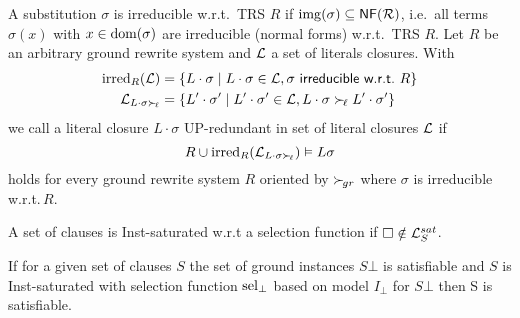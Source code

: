 \begin{definition}
    A substitution \( \sigma \) is irreducible w.r.t.~TRS \( R \)
    if
    \( \operatorname{img}(\sigma)\subseteq\mathsf{NF}(\mathcal{R}) \),
    i.e.~all terms \(\sigma(x)\) with
    \( x\in\operatorname{dom}(\sigma) \) are irreducible (normal forms) w.r.t.~TRS \(R\).
    Let $R$ be an arbitrary ground rewrite system
    and $\mathcal{L}$ a set of literals closures.
    With
    \begin{align*}
        \operatorname{irred}_R(\mathcal{L}) &= \{ L\cdot\sigma \mid L\cdot\sigma\in\mathcal{L},
        \sigma\textsf{ irreducible w.r.t.~}R \}
    \\
        \mathcal{L}_{L\cdot\sigma\mathrel\succ_{\!\ell}} &= \{
            L'\cdot\sigma'\mid L'\cdot\sigma'\in\mathcal{L}, L\cdot\sigma\mathrel\succ_{\!\ell} L'\cdot\sigma'
            \}
    \end{align*}
    we call a literal closure $L\cdot\sigma$ {\myem UP-redundant}
    in set of literal closures $\mathcal{L}$
    if
    \[
        R \cup \operatorname{irred}_R(\mathcal{L}_{L\cdot\sigma\mathrel\succ_{\!\ell}}) \vDash L\sigma
    \]
    holds for every ground rewrite system $R$ oriented by $\mathrel\succ_{\!gr}$
    where $\sigma$ is irreducible w.r.t.\,$R$.


\end{definition}

\begin{definition}
    A set of clauses is Inst-saturated w.r.t a selection function if
    $\square\notin\mathcal{L}_S^{sat}$.
\end{definition}

\begin{theorem}
    If for a given set of clauses $S$
    the set of ground instances $S\bot$ is satisfiable
    and $S$ is Inst-saturated
    with selection function $\operatorname{sel}_\bot$ based
    on model $I_\bot$ for $S\bot$
    then S is satisfiable.
\end{theorem}

